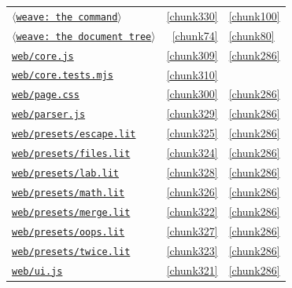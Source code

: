 \documentclass[10pt,a4paper]{article}
\newcounter{chunk}
\newcommand{\chunkname}[1]{\ensuremath{\langle}\texttt{#1}\ensuremath{\rangle}}
\begin{document}
\begin{longtable}{@{}p{}rp{}@{}}
\hyperref[chunk330]{\chunkname{weave: the command}} & \ref*{chunk330} & \hyperref[chunk100]{\ref*{chunk100}} \\
\hyperref[chunk74]{\chunkname{weave: the document tree}} & \ref*{chunk74} & \hyperref[chunk80]{\ref*{chunk80}} \\
\hyperref[chunk309]{\texttt{web/\allowbreak{}core.\allowbreak{}js}} & \ref*{chunk309} & \hyperref[chunk286]{\ref*{chunk286}} \\
\hyperref[chunk310]{\texttt{web/\allowbreak{}core.\allowbreak{}tests.\allowbreak{}mjs}} & \ref*{chunk310} &  \\
\hyperref[chunk300]{\texttt{web/\allowbreak{}page.\allowbreak{}css}} & \ref*{chunk300} & \hyperref[chunk286]{\ref*{chunk286}} \\
\hyperref[chunk329]{\texttt{web/\allowbreak{}parser.\allowbreak{}js}} & \ref*{chunk329} & \hyperref[chunk286]{\ref*{chunk286}} \\
\hyperref[chunk325]{\texttt{web/\allowbreak{}presets/\allowbreak{}escape.\allowbreak{}lit}} & \ref*{chunk325} & \hyperref[chunk286]{\ref*{chunk286}} \\
\hyperref[chunk324]{\texttt{web/\allowbreak{}presets/\allowbreak{}files.\allowbreak{}lit}} & \ref*{chunk324} & \hyperref[chunk286]{\ref*{chunk286}} \\
\hyperref[chunk328]{\texttt{web/\allowbreak{}presets/\allowbreak{}lab.\allowbreak{}lit}} & \ref*{chunk328} & \hyperref[chunk286]{\ref*{chunk286}} \\
\hyperref[chunk326]{\texttt{web/\allowbreak{}presets/\allowbreak{}math.\allowbreak{}lit}} & \ref*{chunk326} & \hyperref[chunk286]{\ref*{chunk286}} \\
\hyperref[chunk322]{\texttt{web/\allowbreak{}presets/\allowbreak{}merge.\allowbreak{}lit}} & \ref*{chunk322} & \hyperref[chunk286]{\ref*{chunk286}} \\
\hyperref[chunk327]{\texttt{web/\allowbreak{}presets/\allowbreak{}oops.\allowbreak{}lit}} & \ref*{chunk327} & \hyperref[chunk286]{\ref*{chunk286}} \\
\hyperref[chunk323]{\texttt{web/\allowbreak{}presets/\allowbreak{}twice.\allowbreak{}lit}} & \ref*{chunk323} & \hyperref[chunk286]{\ref*{chunk286}} \\
\hyperref[chunk321]{\texttt{web/\allowbreak{}ui.\allowbreak{}js}} & \ref*{chunk321} & \hyperref[chunk286]{\ref*{chunk286}} \\
\end{longtable}
\end{document}
